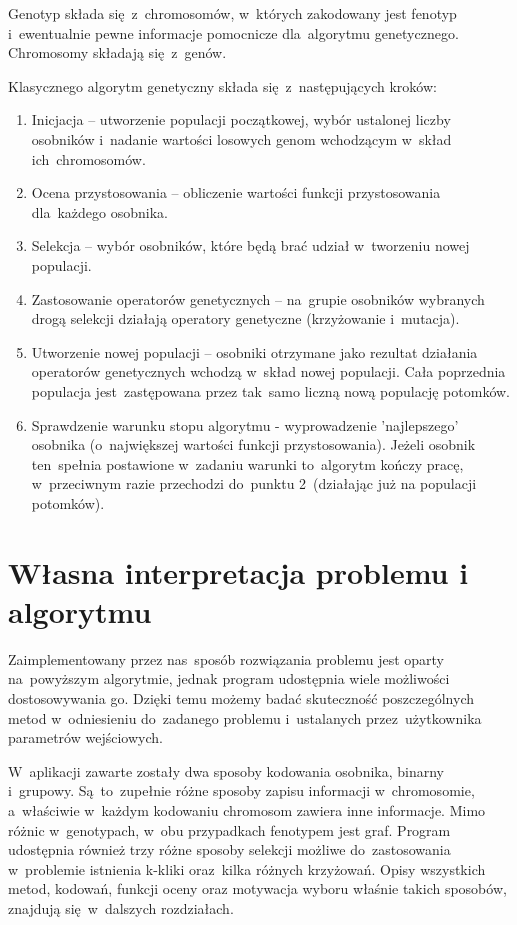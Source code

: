 \documentclass[11pt]{aghdpl}
\begin{document}
Genotyp składa się~z~chromosomów, w~których zakodowany jest fenotyp i~ewentualnie pewne informacje
pomocnicze dla~algorytmu genetycznego. Chromosomy składają się~z~genów.

Klasycznego algorytm genetyczny składa się~z~następujących kroków:
\begin{enumerate}
\item Inicjacja – utworzenie populacji początkowej, wybór ustalonej liczby osobników i~nadanie wartości losowych 
genom wchodzącym w~skład ich~chromosomów.
\item Ocena przystosowania – obliczenie wartości funkcji przystosowania dla~każdego osobnika.
\item Selekcja – wybór osobników, które będą brać udział w~tworzeniu nowej populacji.
\item Zastosowanie operatorów genetycznych – na~grupie osobników wybranych drogą selekcji działają
operatory genetyczne (krzyżowanie i~mutacja).
\item Utworzenie nowej populacji – osobniki otrzymane jako rezultat działania operatorów
genetycznych wchodzą w~skład nowej populacji. Cała poprzednia populacja jest~zastępowana przez
tak~samo liczną nową populację potomków.
\item Sprawdzenie warunku stopu algorytmu - wyprowadzenie 'najlepszego' osobnika (o~największej wartości funkcji 
przystosowania). Jeżeli osobnik ten~spełnia postawione w~zadaniu warunki to~algorytm kończy pracę, w~przeciwnym 
razie przechodzi do~punktu 2~(działając już na populacji potomków).

\end{enumerate}
\section{Własna interpretacja problemu i algorytmu}
\label{sec:podejscie}
Zaimplementowany przez nas~sposób rozwiązania problemu jest oparty na~powyższym algorytmie, jednak program 
udostępnia wiele możliwości dostosowywania go. Dzięki temu możemy badać skuteczność poszczególnych metod 
w~odniesieniu do~zadanego problemu i~ustalanych przez~użytkownika parametrów wejściowych.

W~aplikacji zawarte zostały dwa sposoby kodowania osobnika, binarny i~grupowy. Są~to~zupełnie różne sposoby
zapisu informacji w~chromosomie, a~właściwie w~każdym kodowaniu chromosom zawiera inne informacje. Mimo różnic w~genotypach, 
w~obu przypadkach fenotypem jest graf.
Program udostępnia również trzy różne sposoby selekcji możliwe do~zastosowania w~problemie istnienia k-kliki oraz~kilka 
różnych krzyżowań. Opisy wszystkich metod, kodowań, funkcji oceny oraz motywacja wyboru właśnie takich 
sposobów, znajdują się~w~dalszych rozdziałach.
\end{document}
